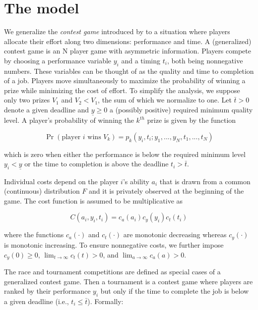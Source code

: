 \documentclass[12pt,]{article}
\newcommand\deadline{\bar{t}}
\newcommand\target{\underline{y}}
\begin{document}
\section{The model}\label{the-model}

We generalize the \emph{contest game} introduced by
\citet{moldovanu2001optimal} to a situation where players allocate their
effort along two dimensions: performance and time. A (generalized)
contest game is an N player game with asymmetric information. Players
compete by choosing a performance variable \(y_i\) and a timing \(t_i\),
both being nonnegative numbers. These variables can be thought of as the
quality and time to completion of a job. Players move simultaneously to
maximize the probability of winning a prize while minimizing the cost of
effort. To simplify the analysis, we suppose only two prizes \(V_1\) and
\(V_2< V_1\), the sum of which we normalize to one. Let \(\deadline>0\)
denote a given deadline and \(\target\geq 0\) a (possibly positive)
required minimum quality level. A player's probability of winning the
\(k^{th}\) prize is given by the function

\begin{equation}
  \Pr(\text{player }i\text{ wins }V_k) = p_{k}(y_i, t_i; y_1,..., y_N, t_1, ..., t_N)
\end{equation}

which is zero when either the performance is below the required minimum
level \(y_i<\target\) or the time to completion is above the deadline
\(t_i>\deadline\).

Individual costs depend on the player \(i\)'s ability \(a_i\) that is
drawn from a common (continuous) distribution \(F\) and it is privately
observed at the beginning of the game. The cost function is assumed to
be multiplicative as

\begin{equation}
  C(a_i, y_i, t_i) = c_a(a_i) c_y(y_i) c_t(t_i)
\end{equation}

where the functions \(c_a(\cdot)\) and \(c_t(\cdot)\) are monotonic
decreasing whereas \(c_{y}(\cdot)\) is monotonic increasing. To ensure
nonnegative costs, we further impose \(c_{y}(0)\geq 0\),
\(\lim_{t\rightarrow \infty}c_{t}(t)>0\), and
\(\lim_{a\rightarrow \infty}c_{a}(a)>0\).

The race and tournament competitions are defined as special cases of a
generalized contest game. Then a tournament is a contest game where
players are ranked by their performance \(y_i\) but only if the time to
complete the job is below a given deadline (i.e., \(t_i \leq \bar{t}\)).
Formally:
\end{document}
